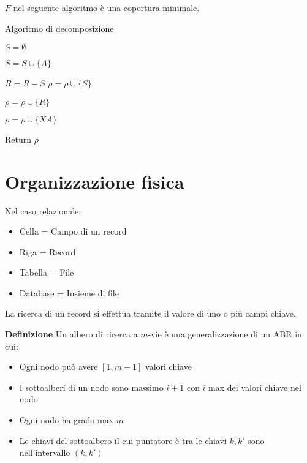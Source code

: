 \documentclass{article}
\begin{document}
\noindent $F$ nel seguente algoritmo è una copertura minimale.\newline

\begin{algorithm}[ht]
    \caption{Algoritmo di decomposizione}
    \begin{algorithmic}
        \State $S=\emptyset$
        
            \State $S=S\cup\{A\}$
        \EndFor
        

            \State $R=R-S$
            \State $\rho=\rho\cup\{S\}$

        \EndIf


            \State $\rho=\rho\cup\{R\}$

        \Else


                \State $\rho=\rho\cup\{XA\}$

            \EndFor

        \EndIf

        \State Return $\rho$
        
    \end{algorithmic}
\end{algorithm}

\section{Organizzazione fisica}

Nel caso relazionale:
\begin{itemize}
    \item Cella = Campo di un record
    \item Riga = Record
    \item Tabella = File
    \item Database = Insieme di file\newline
\end{itemize}

\noindent La ricerca di un record si effettua tramite il valore di uno o più campi chiave.

\newpage

\noindent\textbf{Definizione} Un albero di ricerca a $m$-vie è una generalizzazione di un ABR in cui:
\begin{itemize}
    \item Ogni nodo può avere $[1,m-1]$ valori chiave
    \item I sottoalberi di un nodo sono massimo $i+1$ con $i$ max dei valori chiave nel nodo
    \item Ogni nodo ha grado max $m$
    \item Le chiavi del sottoalbero il cui puntatore è tra le chiavi $k,k'$ sono nell'intervallo $(k,k')$\newline
\end{itemize}
\end{document}
